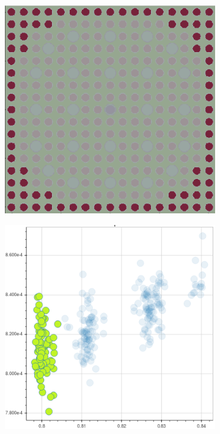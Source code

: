 \begin{figure}[h!]
\begin{subfigure}{0.42\textwidth}
  \caption{}
  \label{fig:chap10-capt-mean-std-mgxs}
\end{subfigure}
\begin{subfigure}{0.42\textwidth}
  \centering
  \includegraphics[width=0.9\linewidth]{figures/unsupervised/features/assm-16/u238-capt/mean-std/geometry-2}
  \caption{}
  \label{fig:chap10-capt-mean-std-geom-2}
\end{subfigure}%
\begin{subfigure}{0.42\textwidth}
  \centering
  \includegraphics[width=0.9\linewidth]{figures/unsupervised/features/assm-16/u238-capt/mean-std/mgxs-2}

\end{subfigure}
\end{figure}
